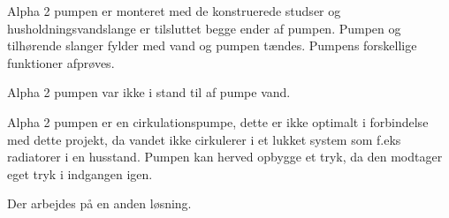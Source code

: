 
Alpha 2 pumpen er monteret med de konstruerede studser og husholdningsvandslange er tilsluttet begge ender af pumpen. Pumpen og tilhørende slanger fylder med vand og pumpen tændes. Pumpens forskellige funktioner afprøves.

Alpha 2 pumpen var ikke i stand til af pumpe vand.  

Alpha 2 pumpen er en cirkulationspumpe, dette er ikke optimalt i forbindelse med dette projekt, da vandet ikke cirkulerer i et lukket system som f.eks radiatorer i en husstand. Pumpen kan herved opbygge et tryk, da den modtager eget tryk i indgangen igen. 

Der arbejdes på en anden løsning.  